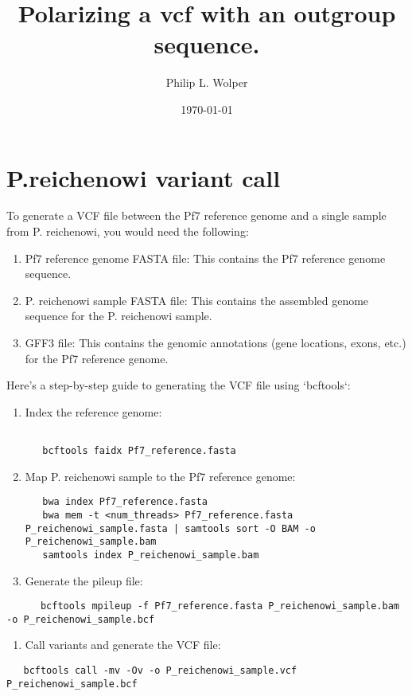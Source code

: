 \documentclass[11pt]{article}
\author{Philip L. Wolper}
\date{\today}
\title{Polarizing a vcf with an outgroup sequence.}
\begin{document}
\maketitle
\tableofcontents


\section{P.reichenowi variant call}
\label{sec:org5bbf1d7}
To generate a VCF file between the Pf7 reference genome and a single sample from P. reichenowi, you would need the following:

\begin{enumerate}
\item Pf7 reference genome FASTA file: This contains the Pf7 reference genome sequence.
\item P. reichenowi sample FASTA file: This contains the assembled genome sequence for the P. reichenowi sample.
\item GFF3 file: This contains the genomic annotations (gene locations, exons, etc.) for the Pf7 reference genome.
\end{enumerate}

Here's a step-by-step guide to generating the VCF file using `bcftools`:

\begin{enumerate}
\item Index the reference genome:
\begin{verbatim}

   bcftools faidx Pf7_reference.fasta

\end{verbatim}

\item Map P. reichenowi sample to the Pf7 reference genome:
\begin{verbatim}
   bwa index Pf7_reference.fasta
   bwa mem -t <num_threads> Pf7_reference.fasta P_reichenowi_sample.fasta | samtools sort -O BAM -o P_reichenowi_sample.bam
   samtools index P_reichenowi_sample.bam
\end{verbatim}

\item Generate the pileup file:
\end{enumerate}
\begin{verbatim}
      bcftools mpileup -f Pf7_reference.fasta P_reichenowi_sample.bam -o P_reichenowi_sample.bcf
\end{verbatim}

\begin{enumerate}
\item Call variants and generate the VCF file:
\end{enumerate}
\begin{verbatim}
   bcftools call -mv -Ov -o P_reichenowi_sample.vcf P_reichenowi_sample.bcf
\end{verbatim}
\end{document}
